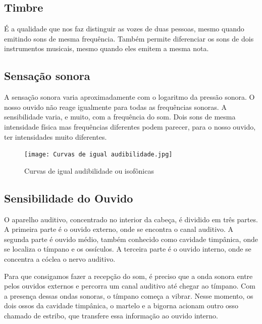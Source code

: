\documentclass[
	article,			%
	11pt,				%
	oneside,			%
	a4paper,			%
	english,			%
	brazil,				%
	sumario=tradicional
	]{abntex2}
\begin{document}
\subsection{Timbre}
É a qualidade que nos faz distinguir as vozes de duas pessoas, mesmo quando emitindo sons de mesma frequência.
Também permite diferenciar os sons de dois instrumentos musicais, mesmo quando eles emitem a mesma nota.

\subsection{Sensação sonora}
A sensação sonora varia aproximadamente com o logaritmo da pressão sonora.
O nosso ouvido não reage igualmente para todas as frequências sonoras.
A sensibilidade varia, e muito, com a frequência do som.
Dois sons de mesma intensidade física mas frequências diferentes podem parecer, para o nosso ouvido, ter intensidades muito diferentes.

\begin{figure}[h]
\caption{Curvas de igual audibilidade ou
isofônicas}
\centering
\texttt{[image: Curvas de igual audibilidade.jpg]}
\label{Curvas de igual audibilidade ou
isofônicas}
\end{figure}

\subsection{Sensibilidade do Ouvido}

O aparelho auditivo, concentrado no interior da cabeça, é dividido em três partes. A primeira parte é o ouvido externo, onde se encontra o canal auditivo. A segunda parte é ouvido médio, também conhecido como cavidade timpânica, onde se localiza o tímpano e os ossículos. A terceira parte é o ouvido interno, onde se concentra a cóclea o nervo auditivo.

Para que consigamos fazer a recepção do som, é preciso que a onda sonora entre pelos ouvidos externos e percorra um canal auditivo até chegar ao tímpano. Com a presença dessas ondas sonoras, o tímpano começa a vibrar. Nesse momento, os dois ossos da cavidade timpânica, o martelo e a bigorna acionam outro osso chamado de estribo, que transfere essa informação ao ouvido interno.
\end{document}
